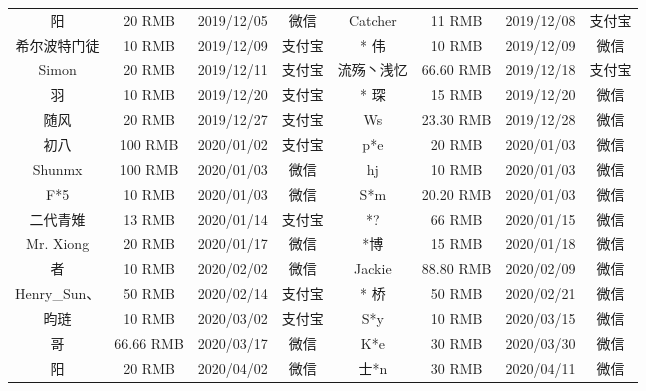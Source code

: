 \documentclass[cn,geye,blue,14pt,normal]{elegantnote}
\begin{document}
\begin{table}[htbp]
\begin{tabular}{*{8}{>{\scriptsize}c}}
    * 阳            & 20 RMB        & 2019/12/05    & 微信          & Catcher         & 11 RMB        & 2019/12/08    & 支付宝        \\
    希尔波特门徒    & 10 RMB        & 2019/12/09    & 支付宝        & * 伟            & 10 RMB        & 2019/12/09    & 微信          \\
    Simon           & 20 RMB        & 2019/12/11    & 支付宝        & 流殇丶浅忆      & 66.60 RMB     & 2019/12/18    & 支付宝        \\
    羽              & 10 RMB        & 2019/12/20    & 支付宝        & * 琛            & 15 RMB        & 2019/12/20    & 微信          \\
    随风            & 20 RMB        & 2019/12/27    & 支付宝        & Ws              & 23.30 RMB     & 2019/12/28    & 微信          \\
    初八            & 100 RMB       & 2020/01/02    & 支付宝        & p*e             & 20 RMB        & 2020/01/03    & 微信          \\
    Shunmx          & 100 RMB       & 2020/01/03    & 微信          & hj              & 10 RMB        & 2020/01/03    & 微信          \\
    F*5             & 10 RMB        & 2020/01/03    & 微信          & S*m             & 20.20 RMB     & 2020/01/03    & 微信          \\
    二代青雉        & 13 RMB        & 2020/01/14    & 支付宝        & *?              & 66 RMB        & 2020/01/15    & 微信          \\
    Mr. Xiong       & 20 RMB        & 2020/01/17    & 微信          & *博             & 15 RMB        & 2020/01/18    & 微信          \\
    * 者            & 10 RMB        & 2020/02/02    & 微信          & Jackie          & 88.80 RMB     & 2020/02/09    & 微信          \\
    Henry\_Sun、    & 50 RMB        & 2020/02/14    & 支付宝        & * 桥            & 50 RMB        & 2020/02/21    & 微信          \\
    昀琏            & 10 RMB        & 2020/03/02    & 支付宝        & S*y             & 10 RMB        & 2020/03/15    & 微信          \\
    * 哥            & 66.66 RMB     & 2020/03/17    & 微信          & K*e             & 30 RMB        & 2020/03/30    & 微信          \\
    * 阳            & 20 RMB        & 2020/04/02    & 微信          & 士*n            & 30 RMB        & 2020/04/11    & 微信          \\
    \bottomrule
  \end{tabular}%
  \label{tab:donation}%
\end{table}%
\end{document}
